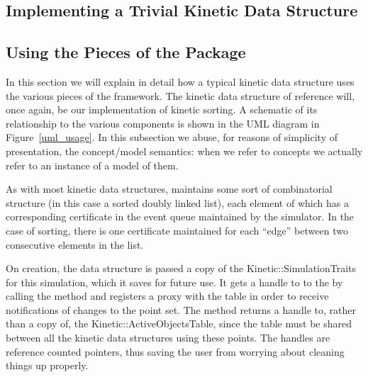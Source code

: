 
\subsection{Implementing a Trivial Kinetic Data Structure}
\label{sec:trivial_kds_example}

\subsection{Using the Pieces of the Package}

In this section we will explain in detail how a typical kinetic data
structure uses the various pieces of the framework. The kinetic data
structure of reference will, once again, be our implementation of
kinetic sorting.  A schematic of its relationship to the various
components is shown in the UML diagram in Figure~\ref{uml_usage}. In
this subsection we abuse, for reasons of simplicity of presentation,
the concept/model semantics: when we refer to concepts we actually
refer to an instance of a model of them.

As with most kinetic data structures,  maintains
some sort of combinatorial structure (in this case a sorted doubly linked list),
each element of which has a corresponding certificate in the event queue
maintained by the simulator. In the case of sorting, there is one
certificate maintained for each ``edge'' between two consecutive
elements in the list.

On creation, the data structure is passed a copy of the
Kinetic::SimulationTraits for this simulation, which it saves for
future use. It gets a handle to to the  by
calling the
 method
and registers a proxy with the table in order to receive notifications
of changes to the point set.  The  method
returns a handle to, rather than a copy of, the
Kinetic::ActiveObjectsTable, since the table must be shared between
all the kinetic data structures using these points.  The handles are
reference counted pointers, thus saving the user from worrying about
cleaning things up properly.

